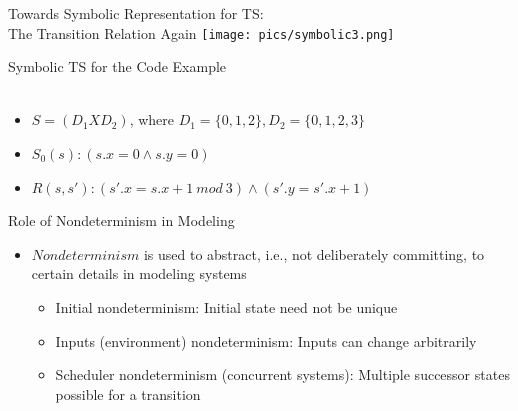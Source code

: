 \documentclass{beamer}
\begin{document}
\begin{frame}{Towards Symbolic Representation for TS:\\The Transition Relation Again}
\texttt{[image: pics/symbolic3.png]}
\end{frame}

\begin{frame}{Symbolic TS for the Code Example}
\hfill
{} \\
 \\
\begin{itemize}
\item<3-> $S = (D_1 X D_2)$, where $D_1 = \{0,1,2\}, D_2 = \{0,1,2,3\}$
\item<3-> $S_0(s): (s.x = 0 \land s.y =0)$
\item<3-> $R(s,s'): (s'.x = s.x+1~mod~3) \land (s'.y = s'.x + 1) $
\end{itemize}
\end{frame}

\begin{frame}{Role of Nondeterminism in Modeling}
\begin{itemize}
\item<1-> $Nondeterminism$ is used to abstract, i.e., not deliberately committing, to certain details in modeling systems
\begin{itemize}
\item<2-> Initial nondeterminism: Initial state need not be unique

\item<3-> Inputs (environment) nondeterminism: Inputs can change arbitrarily

\item<4-> Scheduler nondeterminism (concurrent systems): Multiple successor states possible for a transition

\end{itemize}
\end{itemize}
\end{frame}
\end{document}
